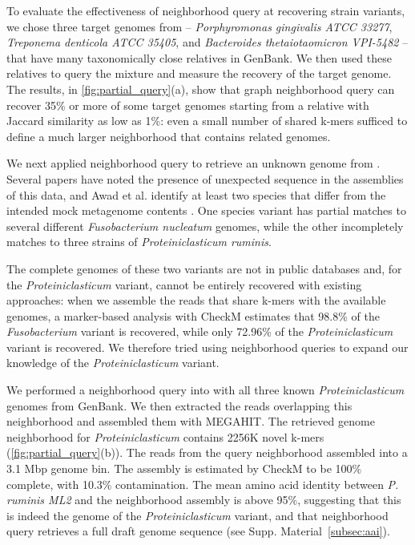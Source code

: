To evaluate the effectiveness of neighborhood query at recovering
strain variants,
we chose three target genomes from \podarv -- {\em Porphyromonas
  gingivalis ATCC 33277}, {\em Treponema denticola ATCC 35405}, and
{\em Bacteroides thetaiotaomicron VPI-5482} -- that have many
taxonomically close relatives in GenBank. We then used these relatives
to query the \podarv mixture and measure the recovery of the target
genome.  The results, in \autoref{fig:partial_query}(a), show that
graph neighborhood query can recover 35\% or more of some target genomes
starting from a relative with Jaccard similarity as low as 1\%: even a
small number of shared k-mers sufficed to define a much larger neighborhood
that contains related genomes.

We next applied neighborhood query to retrieve an unknown genome from \podarv.
Several papers have noted the
presence of unexpected sequence in the assemblies of this data, and
Awad et al. identify at least two species that differ from
the intended mock metagenome contents \cite{megahit,Awad155358}.  One species
variant has partial matches to several different {\em
  Fusobacterium nucleatum} genomes, while the other incompletely matches to
three strains of
{\em Proteiniclasticum ruminis}.

The complete genomes of these two variants are not in public databases and, for
the {\em Proteiniclasticum} variant, cannot
be entirely recovered with existing approaches: when we
assemble the reads that share k-mers with the available genomes, a
marker-based analysis with CheckM estimates that 98.8\% of the {\em
  Fusobacterium} variant is recovered, while only 72.96\% of the {\em
  Proteiniclasticum} variant is recovered. We therefore tried using
neighborhood queries to expand our knowledge of the {\em Proteiniclasticum} variant.

We performed a neighborhood query into \podarv with all three known {\em
  Proteiniclasticum} genomes from GenBank.  We then extracted the reads
overlapping this neighborhood and assembled them with MEGAHIT.  The
retrieved genome neighborhood for {\em Proteiniclasticum} contains
2256K novel k-mers (\autoref{fig:partial_query}(b)). The reads from
the query neighborhood assembled into a 3.1 Mbp genome bin. The
assembly is estimated by CheckM to be 100\% complete, with 10.3\%
contamination.
The mean amino acid identity between {\em P. ruminis ML2} and the
neighborhood assembly is above 95\%, suggesting that this is indeed
the genome of the {\em Proteiniclasticum} variant, and that
neighborhood query retrieves a full draft genome sequence (see Supp. Material~\ref{subsec:aai}).

